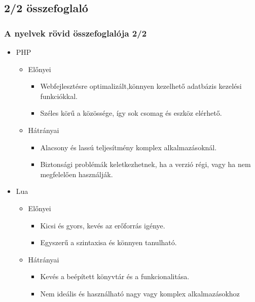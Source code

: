 \documentclass[10pt]{beamer}
\begin{document}
	\subsection{2/2 összefoglaló}
	\begin{frame}
		\frametitle{A nyelvek rövid összefoglalója 2/2}

		\begin{itemize}
			\item PHP
				\begin{itemize}
					\item Előnyei
						\begin{itemize}
							\item Webfejlesztésre optimalizált,könnyen kezelhető adatbázis kezelési
								funkciókkal.

							\item Széles körű a közössége, így sok csomag és eszköz elérhető.
						\end{itemize}

					\item Hátrányai
						\begin{itemize}
							\item Alacsony és lassú teljesítmény komplex alkalmazásoknál.

							\item Biztonsági problémák keletkezhetnek, ha a verzió régi, vagy ha
								nem megfelelően használják.
						\end{itemize}
				\end{itemize}

			\item Lua
				\begin{itemize}
					\item Előnyei
						\begin{itemize}
							\item Kicsi és gyors, kevés az erőforrás igénye.

							\item Egyszerű a szintaxisa és könnyen tanulható.
						\end{itemize}

					\item Hátrányai
						\begin{itemize}
							\item Kevés a beépített könyvtár és a funkcionalitása.

							\item Nem ideális és használható nagy vagy komplex alkalmazásokhoz
						\end{itemize}
				\end{itemize}
		\end{itemize}
	\end{frame}
\end{document}
